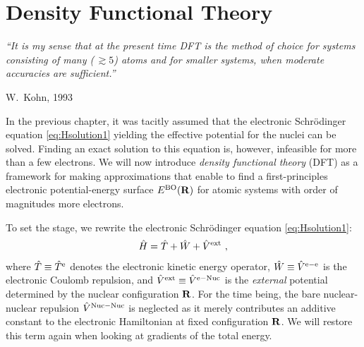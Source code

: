 \newpage
\section{Density Functional Theory}
\epigraph{\singlespacing \it ``It is my sense that at the present time DFT is the method of choice for systems consisting of many (\,$\gtrsim 5$) atoms and for smaller systems, when moderate accuracies are sufficient.''}{W.~Kohn, 1993}

In the previous chapter, it was tacitly assumed that the electronic Schr\"odinger equation \eqref{eq:Hsolution1} yielding the effective potential for the nuclei can be solved. Finding an exact solution to this equation is, however, infeasible for more than a few electrons. We will now introduce \emph{density functional theory} (DFT) as a framework for making approximations that enable to find a first-principles electronic potential-energy surface $E^{\rm BO} ({\bf R})$ for atomic systems with order of magnitudes more electrons.

To set the stage, we rewrite the electronic Schr\"odinger equation \eqref{eq:Hsolution1}:
\begin{align}
	\hat H = \hat T + \hat W + \hat V^{\rm ext}~,
	\label{eq:H.dft.1}
\end{align}
where $\hat T \equiv \hat T^{\rm e}$ denotes the electronic kinetic energy operator, $\hat W \equiv \hat V^{\rm e-e}$ is the electronic Coulomb repulsion, and $\hat V^{\rm ext} \equiv \hat V^{\rm e-Nuc}$ is the \emph{external} potential determined by the nuclear configuration $\bf R$. For the time being, the bare nuclear-nuclear repulsion $\hat V^{\rm Nuc-Nuc}$ is neglected as it merely contributes an additive constant to the electronic Hamiltonian at fixed configuration $\bf R$. We will restore this term again when looking at gradients of the total energy.

